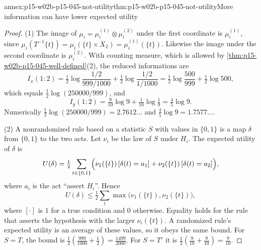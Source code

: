 \begin{annexitem}{annex:p15-w02b-p15-045-not-utility}{thm:p15-w02b-p15-045-not-utility}{More information can have lower expected utility}
\begin{proof}
(1) The image of \(\mu_i=\mu_i^{(1)}\otimes\mu_i^{(2)}\) under the first
coordinate is \(\mu_i^{(1)}\), since
\(\mu_i(T^{-1}\{t\})=\mu_i(\{t\}\times X_2)=\mu_i^{(1)}(\{t\})\).
Likewise the image under the second coordinate is \(\mu_i^{(2)}\). With
counting measure, which is allowed by
\cref{thm:p15-w02b-p15-045-well-defined}(2), the reduced informations
are
\[
  I_x(1:2)=\tfrac12\log\frac{1/2}{999/1000}+\tfrac12\log\frac{1/2}{1/1000}
          =\tfrac12\log\frac{500}{999}+\tfrac12\log500,
\]
which equals \(\tfrac12\log(250000/999)\), and
\[
  I_y(1:2)=\tfrac9{10}\log9+\tfrac1{10}\log\tfrac19=\tfrac45\log9 .
\]
Numerically \(\tfrac12\log(250000/999)=2.7612\ldots\) and
\(\tfrac45\log9=1.7577\ldots\).

(2) A nonrandomized rule based on a statistic \(S\) with values in
\(\{0,1\}\) is a map \(\delta\) from \(\{0,1\}\) to the two acts. Let
\(\nu_i\) be the law of \(S\) under \(H_i\). The expected utility of
\(\delta\) is
\[
  U(\delta)=\tfrac12\sum_{t\in\{0,1\}}\Bigl(\nu_1(\{t\})\,[\delta(t)=a_1]
                       +\nu_2(\{t\})\,[\delta(t)=a_2]\Bigr),
\]
where \(a_i\) is the act ``assert \(H_i\)''. Hence
\[
  U(\delta)\leq\tfrac12\sum_t\max\bigl(\nu_1(\{t\}),\nu_2(\{t\})\bigr),
\]
where \([\cdot]\) is \(1\) for a true condition and \(0\) otherwise.
Equality holds for the rule that asserts the hypothesis with the larger
\(\nu_i(\{t\})\). A randomized rule's expected utility is an average of
these values, so it obeys the same bound. For \(S=T\), the bound is
\(\tfrac12(\tfrac{999}{1000}+\tfrac12)=\tfrac{1499}{2000}\). For \(S=T'\)
it is \(\tfrac12(\tfrac9{10}+\tfrac9{10})=\tfrac9{10}\).
\end{proof}
\end{annexitem}

